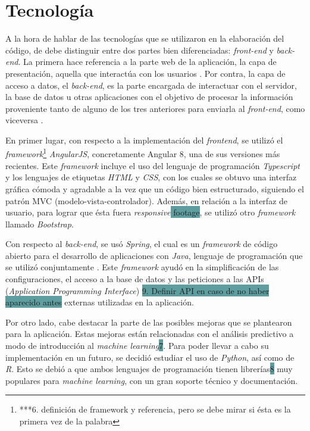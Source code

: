 \documentclass[pdftex,11pt,a4paper]{book}
\begin{document}
\section{Tecnología}

A la hora de hablar de las tecnologías que se utilizaron en la elaboración del código, de debe distinguir entre dos partes bien diferenciadas: \textit{front-end} y \textit{back-end}. La primera hace referencia a la parte web de la aplicación, la capa de presentación, aquella que interactúa con los usuarios \cite{bib:front-end}. Por contra, la capa de acceso a datos, el \textit{back-end}, es la parte encargada de interactuar con el servidor, la base de datos u otras aplicaciones con el objetivo de procesar la información proveniente tanto de alguno de los tres anteriores para enviarla al \textit{front-end}, como viceversa \cite{bib:frontendybackend}.

En primer lugar, con respecto a la implementación del \textit{frontend}, se utilizó el \textit{framework}\footnote{\colorbox{MiColor}{ ***6. definición de framework y referencia, pero se debe mirar si ésta es la primera vez de la palabra} } \textit{AngularJS}, concretamente Angular 8, una de sus versiones más recientes. Este \textit{framework} incluye el uso del lenguaje de programación \textit{Typescript} y los lenguajes de etiquetas \textit{HTML} y \textit{CSS}, con los cuales se obtuvo una interfaz gráfica cómoda y agradable a la vez que un código bien estructurado, siguiendo el patrón MVC (modelo-vista-controlador). Además, en relación a la interfaz de usuario, para lograr que ésta fuera \textit{responsive}\colorbox{CadetBlue}{ footage}, se utilizó otro \textit{framework} llamado \textit{Bootstrap}.

Con respecto al \textit{back-end}, se usó \textit{Spring}, el cual es un \textit{framework} de código abierto para el desarrollo de aplicaciones con \textit{Java}, lenguaje de programación que se utilizó conjuntamente \cite{bib:spring}. Este \textit{framework} ayudó en la simplificación de las configuraciones, el acceso a la base de datos y las peticiones a las APIs (\textit{Application Programming Interface}) \colorbox{CadetBlue}{9. Definir API en caso de no haber aparecido antes} externas utilizadas en la aplicación.  

Por otro lado, cabe destacar la parte de las posibles mejoras que se plantearon para la aplicación. Estas mejoras están relacionadas con el análisis predictivo a modo de introducción al \textit{machine learning}\colorbox{CadetBlue}{7}. Para poder llevar a cabo su implementación en un futuro, se decidió estudiar el uso de \textit{Python}, así como de \textit{R}. Esto se debió a que ambos lenguajes de programación tienen librerías\colorbox{CadetBlue}{8} muy populares para \textit{machine learning}, con un gran soporte técnico y documentación.
\end{document}
